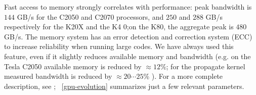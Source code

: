 \documentclass{elsarticle}
\begin{document}
Fast access to memory strongly correlates with performance: peak bandwidth 
is $144$ GB/s for the C2050 and C2070 processors, and $250$ and $288$ GB/s 
respectively for the K20X and the K4 0;on the K80, the aggregate peak is 
$480$ GB/s. 
%
The memory system has an error detection and correction system (ECC) to
increase reliability when running large codes. 
%
We have always used this feature, even if it slightly reduces available 
memory and bandwidth (e.g. on the Tesla C2050 available memory is reduced 
by $\approx 12\%$; for the propagate kernel measured bandwidth is reduced 
by $\approx 20 \cdots 25$\% ).
%
For a more complete description, see \cite{fermi,kepler}; 
\tablename~\ref{gpu-evolution} summarizes just a few relevant parameters.
 
\end{document}

